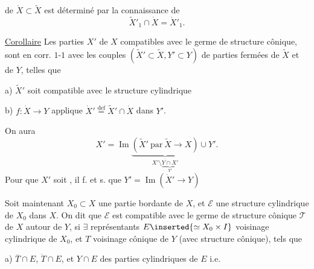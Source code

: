 de $\dot X\subset\widetilde X$ est déterminé par la connaissance de
\[
\widetilde X'_1\cap\dot X=\dot X'_1.
\]

\uline{Corollaire} Les parties  $X'$ de $X$ compatibles avec
le germe de structure cônique, sont en
corr. $1$-$1$ avec les couples $(\widetilde X'\subset\widetilde X,Y'\subset Y)$
de parties fermées de $\widetilde X$ et de $Y$, telles que

a) $\widetilde X'$ soit compatible avec le  structure cylindrique

b) $f:\dot X\to Y$ applique 
$\dot X'\overset{\mathrm{def}}=\widetilde X'\cap\dot X$ dans $Y'$.

On aura
\[
X'=\operatorname{Im}\underbrace{(\widetilde X'\ \text{par}\ \widetilde X\to X)}
_{\overline{X'\setminus\underbrace{Y\cap X'}_{Y'}}}\cup Y'.
\]
Pour que $X'$ soit 
,
il f. et s. que $Y'=\operatorname{Im}(\dot X'\to Y)$

Soit maintenant $X_0\subset X$ une partie
bordante de $X$, et $\mathcal E$ une  structure cylindrique
de $X_0$ dans $X$. On dit que $\mathcal E$ est compatible
avec le germe de structure cônique $\mathcal T$
de $X$ autour de $Y$, si $\exists$ représentants
$E\inserted{\simeq X_0\times I}$ voisinage cylindrique de $X_0$, et $T$ voisinage
cônique de $Y$ (avec  structure cônique), tels que


a) $\overline T\cap E$, $\dot T\cap E$, et $Y\cap E$ 
 des parties cylindriques de
$E$ i.e.


